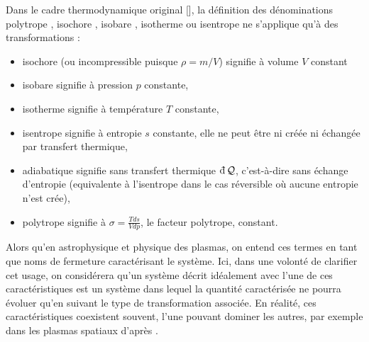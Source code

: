 Dans le cadre thermodynamique original [\cite{borel_thermodynamique_2005}], la définition des dénominations \og polytrope \fg{}, \og isochore \fg{}, \og isobare \fg{}, \og isotherme \fg{} ou \og isentrope \fg{} ne s’applique qu’à des transformations : 
\begin{itemize}
    \item isochore (ou incompressible puisque $\rho = m/V$) signifie à volume $V$ constant
    \item isobare signifie à pression $p$ constante,
    \item isotherme signifie à température $T$ constante, 
    \item isentrope signifie à entropie $s$ constante, elle ne peut être ni créée ni échangée par transfert thermique, 
    \item adiabatique signifie sans transfert thermique $\dj \mathcal{Q}$, c'est-à-dire sans échange d'entropie (equivalente à l'isentrope dans le cas réversible où aucune entropie n'est crée),
    \item polytrope signifie à $\sigma = \frac{Tds}{Vdp}$, le facteur polytrope, constant.
\end{itemize}
Alors qu'en astrophysique et physique des plasmas, on entend ces termes en tant que noms de fermeture caractérisant le système. Ici, dans une volonté de clarifier cet usage, on considérera qu’un système décrit idéalement avec l’une de ces caractéristiques est un système dans lequel la quantité caractérisée ne pourra évoluer qu’en suivant le type de transformation associée. En réalité, ces caractéristiques coexistent souvent, l'une pouvant dominer les autres, par exemple dans les plasmas spatiaux d'après \cite{livadiotis_non-equilibrium_2012}. 

